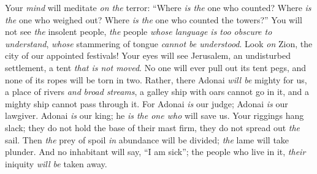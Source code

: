 \begin{biblechapter}
\verse Your \textit{mind} will meditate \textit{on the} terror: 
“Where \textit{is the} one who counted? 
Where \textit{is the} one who weighed out? 
Where \textit{is the} one who counted the towers?”
\verse You will not see \textit{the} insolent people, 
\textit{the} people \textit{whose language is too obscure to understand}, 
\textit{whose} stammering of tongue \textit{cannot be understood}.
\verse Look \textit{on} Zion, the city of our appointed festivals! 
Your eyes will see Jerusalem, 
an undisturbed settlement, 
a tent \textit{that is not moved}. 
No one will ever pull out its tent pegs, 
and none of its ropes will be torn in two.
\verse Rather, there Adonai \textit{will be} mighty for us, 
a place of rivers \textit{and} \textit{broad streams}, 
a galley ship with oars cannot go in it, 
and a mighty ship cannot pass through it.
\verse For Adonai \textit{is} our judge; Adonai \textit{is} our lawgiver. 
Adonai \textit{is} our king; he \textit{is the one who} will save us.
\verse Your riggings hang slack; 
they do not hold the base of their mast firm, 
they do not spread out \textit{the} sail. 
Then \textit{the} prey of spoil \textit{in} abundance will be divided; 
\textit{the} lame will take plunder.
\verse And no inhabitant will say, “I am sick”; 
the people who live in it, \textit{their} iniquity \textit{will be} taken away.
\end{biblechapter}

